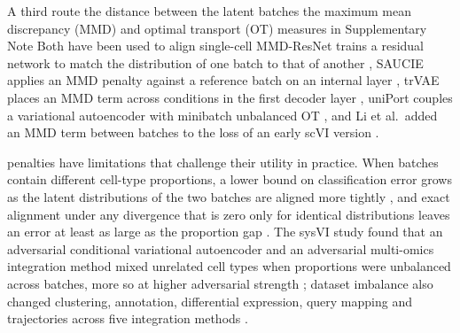 \documentclass[10pt]{article}
\begin{document}
\qquad A third route  the distance between the latent batches  the maximum mean discrepancy (MMD)  and optimal transport (OT) measures  in Supplementary Note  Both  have been used to align single-cell  MMD-ResNet trains a residual network to match the distribution of one batch to that of another \citep{shaham2017removal}, SAUCIE applies an MMD penalty against a reference batch on an internal layer \citep{amodio2019exploring}, trVAE places an MMD term across conditions in the first decoder layer \citep{lotfollahi2020conditional}, uniPort couples a variational autoencoder with minibatch unbalanced OT \citep{cao2022unified}, and Li et al.\ added an MMD term between batches to the loss of an early scVI version \citep{li2022trade}.

\qquad {} penalties have limitations that challenge their utility in practice. When batches contain different cell-type proportions, a lower bound on classification error grows as the latent distributions of the two batches are aligned more tightly \citep{zhao2019learning}, and exact alignment under any divergence that is zero only for identical distributions leaves an error at least as large as the proportion gap \citep{wu2019domain}. The sysVI study found that an adversarial conditional variational autoencoder and an adversarial multi-omics integration method mixed unrelated cell types when proportions were unbalanced across batches,  more so at higher adversarial strength \citep{hrovatin2025integrating}; dataset imbalance also changed clustering, annotation, differential expression, query mapping and trajectories across five integration methods \citep{maan2024characterizing}.


\end{document}
